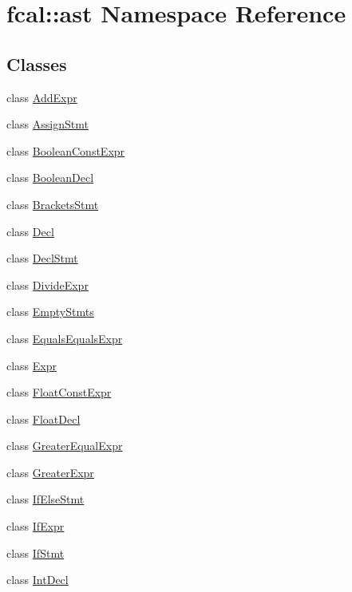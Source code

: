 \hypertarget{namespacefcal_1_1ast}{}\section{fcal\+:\+:ast Namespace Reference}
\label{namespacefcal_1_1ast}
\subsection*{Classes}
\begin{DoxyCompactItemize}
\item 
class \hyperlink{classfcal_1_1ast_1_1AddExpr}{Add\+Expr}
\item 
class \hyperlink{classfcal_1_1ast_1_1AssignStmt}{Assign\+Stmt}
\item 
class \hyperlink{classfcal_1_1ast_1_1BooleanConstExpr}{Boolean\+Const\+Expr}
\item 
class \hyperlink{classfcal_1_1ast_1_1BooleanDecl}{Boolean\+Decl}
\item 
class \hyperlink{classfcal_1_1ast_1_1BracketsStmt}{Brackets\+Stmt}
\item 
class \hyperlink{classfcal_1_1ast_1_1Decl}{Decl}
\item 
class \hyperlink{classfcal_1_1ast_1_1DeclStmt}{Decl\+Stmt}
\item 
class \hyperlink{classfcal_1_1ast_1_1DivideExpr}{Divide\+Expr}
\item 
class \hyperlink{classfcal_1_1ast_1_1EmptyStmts}{Empty\+Stmts}
\item 
class \hyperlink{classfcal_1_1ast_1_1EqualsEqualsExpr}{Equals\+Equals\+Expr}
\item 
class \hyperlink{classfcal_1_1ast_1_1Expr}{Expr}
\item 
class \hyperlink{classfcal_1_1ast_1_1FloatConstExpr}{Float\+Const\+Expr}
\item 
class \hyperlink{classfcal_1_1ast_1_1FloatDecl}{Float\+Decl}
\item 
class \hyperlink{classfcal_1_1ast_1_1GreaterEqualExpr}{Greater\+Equal\+Expr}
\item 
class \hyperlink{classfcal_1_1ast_1_1GreaterExpr}{Greater\+Expr}
\item 
class \hyperlink{classfcal_1_1ast_1_1IfElseStmt}{If\+Else\+Stmt}
\item 
class \hyperlink{classfcal_1_1ast_1_1IfExpr}{If\+Expr}
\item 
class \hyperlink{classfcal_1_1ast_1_1IfStmt}{If\+Stmt}
\item 
class \hyperlink{classfcal_1_1ast_1_1IntDecl}{Int\+Decl}

\end{DoxyCompactItemize}
